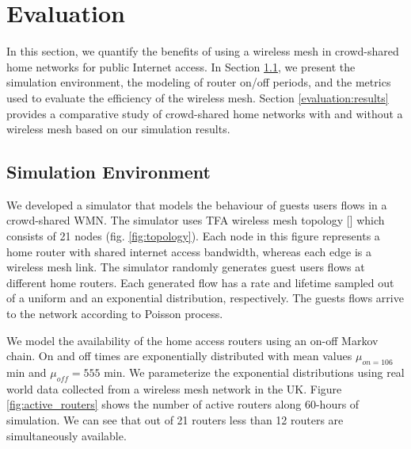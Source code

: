 \section{Evaluation}
\label{sec:evaluation}

In this section, we quantify the benefits of using a wireless mesh in crowd-shared home networks for public Internet access. In Section \ref{evaluation:environment}, we present the simulation environment, the modeling of router on/off periods, and the metrics used to evaluate the efficiency of the wireless mesh. Section \ref{evaluation:results} provides a comparative study of crowd-shared home networks with and without a wireless mesh based on our simulation results.

\subsection{Simulation Environment}
\label{evaluation:environment}


We developed a simulator that models the behaviour of guests users flows in a crowd-shared WMN. The simulator uses TFA wireless mesh topology [] which consists of 21 nodes (fig. \ref{fig:topology}). Each node in this figure represents a home router with shared internet access bandwidth, whereas each edge is a wireless mesh link. The simulator randomly generates guest users flows at different home routers. Each generated flow has a rate and lifetime sampled out of a uniform and an exponential distribution, respectively. The guests flows arrive to the network according to Poisson process. 

We model the availability of the home access routers using an on-off Markov chain. On and off times are exponentially distributed with mean values $\mu_{on = 106}$ min and $\mu_{off} = 555$ min. We parameterize the exponential distributions using real world data collected from a wireless mesh network in the UK. Figure \ref{fig:active_routers} shows the number of active routers along 60-hours of simulation. We can see that out of 21 routers less than 12 routers are simultaneously available. 

